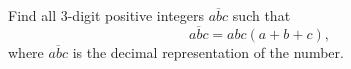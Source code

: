 Find all 3-digit positive integers $\overline{abc}$ such that \[ \overline{abc} = abc(a+b+c) , \] where $\overline{abc}$ is the decimal representation of the number.